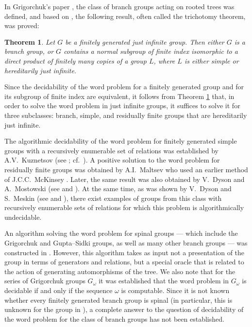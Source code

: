 \documentclass[12pt,a4paper]{amsart}
\newtheorem*{notmytheorem}{Theorem}
\begin{document}
\smallskip

In Grigorchuk's paper \cite{Grigorchuk2000}, the class of branch groups acting on rooted trees was defined, and based on \cite{Wilson1971}, the following result, often called the trichotomy theorem, was proved:

\begin{notmytheorem}
\label{classification}
Let $G$ be a finitely generated just infinite group. Then either $G$ is a branch group, or $G$ contains a normal subgroup of finite index isomorphic to a direct product of finitely many copies of a group $L$, where $L$ is either simple or hereditarily just infinite.
\end{notmytheorem}

Since the decidability of the word problem for a finitely generated group and for its subgroup of finite index are equivalent, it follows from Theorem \ref{classification} that, in order to solve the word problem in just infinite groups, it suffices to solve it for three subclasses: branch, simple, and residually finite groups that are hereditarily just infinite.

The algorithmic decidability of the word problem for finitely generated simple groups with a recursively enumerable set of relations was established by A.V.~Kuznetsov (see \cite{Kuznetsov1958}; cf.~\cite[Theorem 3.6]{LyndonSchupp}). A positive solution to the word problem for residually finite groups was obtained by A.I.~Maltsev \cite{Maltsev1958} who used an earlier method of J.C.C.~McKinsey \cite{McKinsey1943}. Later, the same result was also obtained by V.~Dyson and A.~Mostowski (see \cite{Dyson1964} and \cite{Mostowski1966}). At the same time, as was shown by V.~Dyson and S.~Meskin (see \cite{Dyson1974} and \cite{Meskin1974}), there exist examples of groups from this class with recursively enumerable sets of relations for which this problem is algorithmically undecidable.

An algorithm solving the word problem for spinal groups --- which include the Grigorchuk and Gupta–Sidki groups, as well as many other branch groups --- was constructed in \cite{BarGrigSun2003}. However, this algorithm takes as input not a presentation of the group in terms of generators and relations, but a special oracle that is related to the action of generating automorphisms of the tree. We also note that for the series of Grigorchuk groups $G_{\omega}$ it was established that the word problem in $G_{\omega}$ is decidable if and only if the sequence $\omega$ is computable. Since it is not known whether every finitely generated branch group is spinal (in particular, this is unknown for the group in \cite{Neumann1986}), a complete answer to the question of decidability of the word problem for the class of branch groups has not been established.
\end{document}
